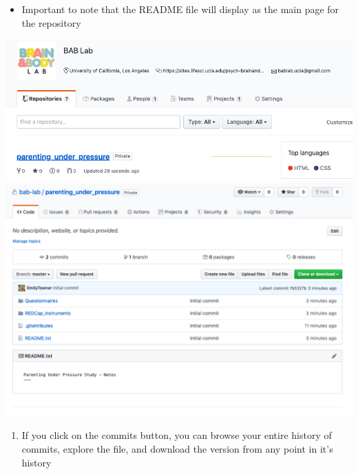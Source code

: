 \documentclass[]{book}
\providecommand{\tightlist}{%
  \setlength{\itemsep}{0pt}\setlength{\parskip}{0pt}}
\begin{document}
\begin{itemize}
\tightlist
\item
  Important to note that the README file will display as the main page for the repository
\end{itemize}

\includegraphics{images/research_protocols/github/13.png}
\includegraphics{images/research_protocols/github/14.png}

\begin{enumerate}
\def\labelenumi{\arabic{enumi}.}
\setcounter{enumi}{9}
\tightlist
\item
  If you click on the commits button, you can browse your entire history of commits, explore the file, and download the version from any point in it's history
\end{enumerate}
\end{document}
